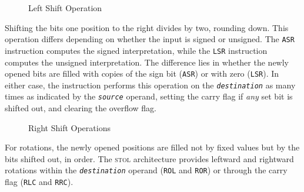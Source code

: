 \documentclass[12pt,english]{book}
\begin{document}
\begin{figure}[ht!]\centering
  \caption{Left Shift Operation}
  \label{fig:early-asl}
\end{figure}

Shifting the bits one position to the right divides by two,
rounding down.
This operation differs depending on whether the input
is signed or unsigned.
The \texttt{ASR} instruction computes the signed interpretation,
while the \texttt{LSR} instruction computes the unsigned interpretation.
The difference lies in whether the newly opened bits
are filled with copies of the sign bit (\texttt{ASR})
or with zero (\texttt{LSR}).
In either case,
the instruction performs this operation
on the \texttt{\textit{destination}} as many times
as indicated by the \texttt{\textit{source}} operand,
setting the carry flag if \emph{any} set bit is shifted out,
and clearing the overflow flag.

\begin{figure}[htb]\centering

  \vspace{\baselineskip}%
  \caption{Right Shift Operations}
  \label{fig:asr-lsr}
\end{figure}

For rotations, the newly opened positions are filled
not by fixed values
but by the bits shifted out, in order.
The \textsc{stol} architecture
provides leftward and rightward rotations
within the \texttt{\textit{destination}} operand
(\texttt{ROL} and \texttt{ROR})
or through the carry flag
(\texttt{RLC} and \texttt{RRC}).
\end{document}
